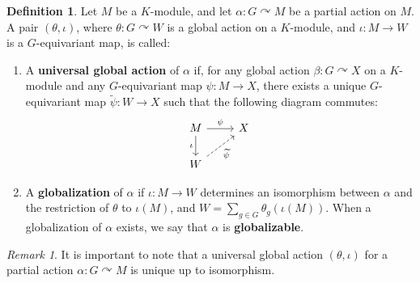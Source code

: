 \documentclass[11pt]{amsart}
\numberwithin{equation}{section}
\theoremstyle{definition}
\newtheorem{definition}[theorem]{Definition}
\theoremstyle{remark}
\newtheorem{remark}[theorem]{Remark}
\newcommand{\cb}[1]{{\color{red}#1}}
\begin{document}
\begin{definition} \label{d: universal global partial action}
    Let \( M \) be a \( K \)-module, and let \( \alpha: G \curvearrowright M \) be a partial action on \( M \). A pair \( (\theta, \iota) \), where \(  \theta : G \curvearrowright W \) is a global action on a \( K \)-module, and \( \iota: M \to W \) is a \( G \)-equivariant map, is called: 
    \begin{enumerate}
        \item A \textbf{universal global action} of \( \alpha \) if, for any global action \( \beta: G \curvearrowright X \) on a \( K \)-module and any \( G \)-equivariant map \( \psi: M \to X \), there exists a unique \( G \)-equivariant map \( \widetilde{\psi}: W \to X \) such that the following diagram commutes:
            \[
                \begin{tikzcd}
                    M \arrow[r, "\psi"] \arrow[d, "\iota"'] & X \\
                    W \arrow[ur, dashed, "\widetilde{\psi}"']
                \end{tikzcd}
            \]

        \item A \textbf{globalization} of \( \alpha \) if \( \iota: M \to W \) determines an isomorphism between \( \alpha \) and the restriction of \( \theta \) to \( \iota(M) \), and \( W = \sum_{g \in G} \theta_g(\iota(M)) \). When a globalization of \( \alpha \) exists, we say that \( \alpha \) is \textbf{globalizable}.

    \end{enumerate}
\end{definition}

\begin{remark}
    It is important to note that a universal global action \( (\theta, \iota) \) for a partial action 
   \( \alpha: G \curvearrowright M \) is unique up to isomorphism.
\end{remark}

    
\end{document}
